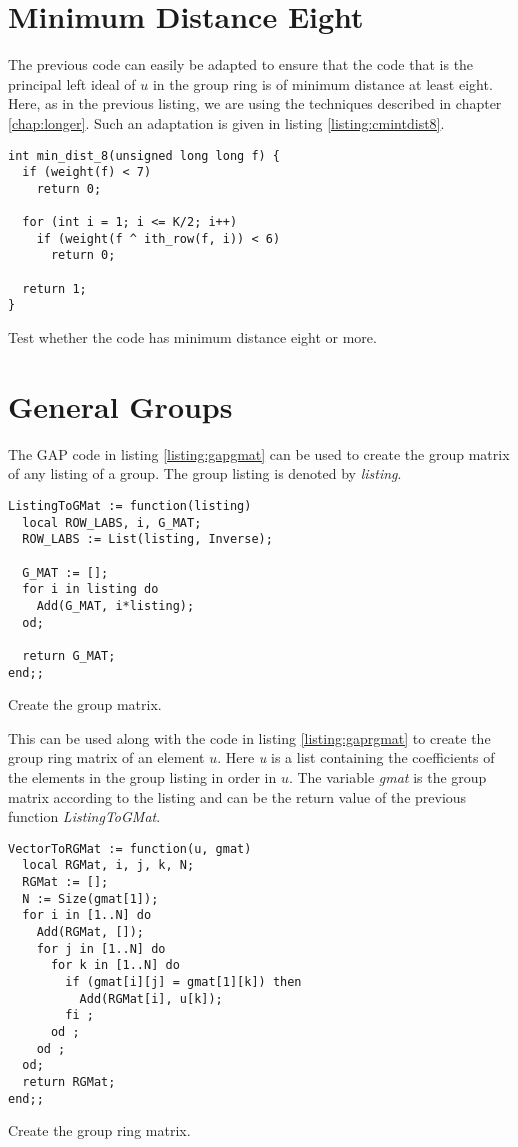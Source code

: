 \section*{Minimum Distance Eight}
The previous code can easily be adapted to ensure that the code that is the principal left ideal of $u$ in the group ring is of minimum distance at least eight.
Here, as in the previous listing, we are using the techniques described in chapter \ref{chap:longer}.
Such an adaptation is given in listing \ref{listing:cmintdist8}.

\begin{listing}[ht]
\begin{verbatim}
int min_dist_8(unsigned long long f) {
  if (weight(f) < 7)
    return 0;
  
  for (int i = 1; i <= K/2; i++) 
    if (weight(f ^ ith_row(f, i)) < 6)
	  return 0;

  return 1;
}
\end{verbatim}
\caption{Test whether the code has minimum distance eight or more.}
\label{listing:cmintdist8}
\end{listing}

\section*{General Groups}
The GAP code in listing \ref{listing:gapgmat} can be used to create the group matrix of any listing of a group.
The group listing is denoted by \emph{listing}.

\begin{listing}[ht]
\begin{verbatim}
ListingToGMat := function(listing)
  local ROW_LABS, i, G_MAT;
  ROW_LABS := List(listing, Inverse);

  G_MAT := [];
  for i in listing do
    Add(G_MAT, i*listing);
  od;

  return G_MAT;
end;;
\end{verbatim}		
\caption{Create the group matrix.}
\label{listing:gapgmat}
\end{listing}

This can be used along with the code in listing \ref{listing:gaprgmat} to create the group ring matrix of an element $u$.
Here \emph{u} is a list containing the coefficients of the elements in the group listing in order in $u$.
The variable \emph{gmat} is the group matrix according to the listing and can be the return value of the previous function \emph{ListingToGMat}.

\begin{listing}[ht]
\begin{verbatim}
VectorToRGMat := function(u, gmat)
  local RGMat, i, j, k, N;
  RGMat := [];
  N := Size(gmat[1]);
  for i in [1..N] do
    Add(RGMat, []);
    for j in [1..N] do
      for k in [1..N] do
        if (gmat[i][j] = gmat[1][k]) then
          Add(RGMat[i], u[k]);
        fi ;
      od ;
    od ;
  od;
  return RGMat;
end;;
\end{verbatim}
\caption{Create the group ring matrix.}
\label{listing:gaprgmat}
\end{listing}